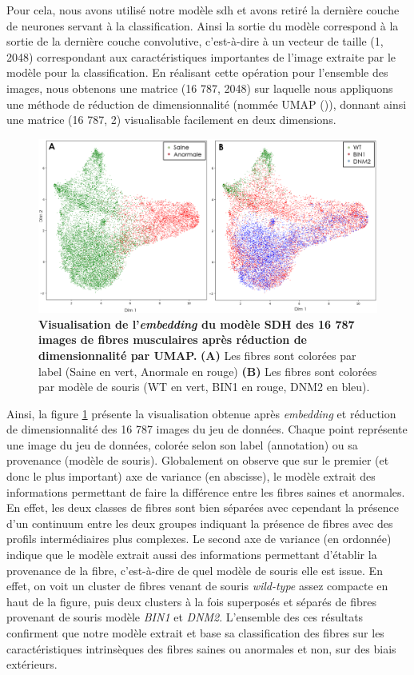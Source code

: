 Pour cela, nous avons utilisé notre modèle \gls{sdh} et avons retiré la dernière couche de neurones servant à la classification. Ainsi la sortie du modèle correspond à la sortie de la dernière couche convolutive, c'est-à-dire à un vecteur de taille (1, 2048) correspondant aux caractéristiques importantes de l'image extraite par le modèle pour la classification. En réalisant cette opération pour l'ensemble des images, nous obtenons une matrice (16 787, 2048) sur laquelle nous appliquons une méthode de réduction de dimensionnalité (nommée UMAP (\cite{mcinnes_umap_2020})), donnant ainsi une matrice (16 787, 2) visualisable facilement en deux dimensions.
\begin{figure}[!ht]
 \centering
 \includegraphics[width=1\textwidth]{figures/umap_sdh.png}
 \caption[Visualisation de l'\textit{embedding} du modèle SDH]{\textbf{Visualisation de l'\textit{embedding} du modèle SDH des 16 787 images de fibres musculaires après réduction de dimensionnalité par UMAP.} \textbf{(A)} Les fibres sont colorées par label (Saine en vert, Anormale en rouge) \textbf{(B)} Les fibres sont colorées par modèle de souris (WT en vert, BIN1 en rouge, DNM2 en bleu).}
 \label{fig:umap_sdh}
\end{figure}

Ainsi, la figure \ref{fig:umap_sdh} présente la visualisation obtenue après \textit{embedding} et réduction de dimensionnalité des 16 787 images du jeu de données. Chaque point représente une image du jeu de données, colorée selon son label (annotation) ou sa provenance (modèle de souris). Globalement on observe que sur le premier (et donc le plus important) axe de variance (en abscisse), le modèle extrait des informations permettant de faire la différence entre les fibres saines et anormales. En effet, les deux classes de fibres sont bien séparées avec cependant la présence d'un continuum entre les deux groupes indiquant la présence de fibres avec des profils intermédiaires plus complexes. Le second axe de variance (en ordonnée) indique que le modèle extrait aussi des informations permettant d'établir la provenance de la fibre, c'est-à-dire de quel modèle de souris elle est issue. En effet, on voit un cluster de fibres venant de souris \textit{wild-type} assez compacte en haut de la figure, puis deux clusters à la fois superposés et séparés de fibres provenant de souris modèle \textit{BIN1} et \textit{DNM2}. L'ensemble des ces résultats confirment que notre modèle extrait et base sa classification des fibres sur les caractéristiques intrinsèques des fibres saines ou anormales et non, sur des biais extérieurs.

